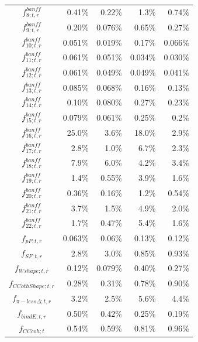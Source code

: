 \begin{table}
\begin{tabular}{| c || D{.}{.}{-1} | D{.}{.}{-1} || D{.}{.}{-1} | D{.}{.}{-1} |}
$f_{8; t, r}^{banff}$         &    0.41\% &    0.22\% &     1.3\% &    0.74\% \\
$f_{9; t, r}^{banff}$         &    0.20\% &   0.076\% &    0.65\% &    0.27\% \\
$f_{10; t, r}^{banff}$        &   0.051\% &   0.019\% &    0.17\% &   0.066\% \\
$f_{11; t, r}^{banff}$        &   0.061\% &   0.051\% &   0.034\% &   0.030\% \\
$f_{12; t, r}^{banff}$        &   0.061\% &   0.049\% &   0.049\% &   0.041\% \\
$f_{13; t, r}^{banff}$        &   0.085\% &   0.068\% &    0.16\% &    0.13\% \\
$f_{14; t, r}^{banff}$        &    0.10\% &   0.080\% &    0.27\% &    0.23\% \\
$f_{15; t, r}^{banff}$        &   0.079\% &   0.061\% &    0.25\% &     0.2\% \\
$f_{16; t, r}^{banff}$        &    25.0\% &     3.6\% &    18.0\% &     2.9\% \\
$f_{17; t, r}^{banff}$        &     2.8\% &     1.0\% &     6.7\% &     2.3\% \\
$f_{18; t, r}^{banff}$        &     7.9\% &     6.0\% &     4.2\% &     3.4\% \\
$f_{19; t, r}^{banff}$        &     1.4\% &    0.55\% &     3.9\% &     1.6\% \\
$f_{20; t, r}^{banff}$        &    0.36\% &    0.16\% &     1.2\% &    0.54\% \\
$f_{21; t, r}^{banff}$        &     3.7\% &     1.5\% &     4.9\% &     2.0\% \\
$f_{22; t, r}^{banff}$        &     1.7\% &    0.47\% &     5.4\% &     1.6\% \\
\hline
$f_{pF; t, r}$                &   0.063\% &    0.06\% &    0.13\% &    0.12\% \\
$f_{SF; t, r}$                &     2.8\% &     3.0\% &    0.85\% &    0.93\% \\
$f_{Wshape; t, r}$            &    0.12\% &   0.079\% &    0.40\% &    0.27\% \\
$f_{CCothShape; t, r}$        &    0.28\% &    0.31\% &    0.78\% &    0.90\% \\
$f_{\pi-less\Delta; t, r}$    &     3.2\% &     2.5\% &     5.6\% &     4.4\% \\
$f_{bindE; t, r}$             &    0.50\% &    0.42\% &     0.25\% &    0.19\% \\
$f_{CCcoh; t}$                &    0.54\% &    0.59\% &    0.81\% &    0.96\% \\

\end{tabular}
\end{table}

